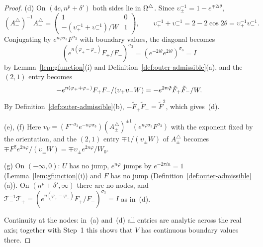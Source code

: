 \begin{proof}
(d) On $(4c,n^p+\delta')$ both sides lie in $\Omega^{\triangle}$. Since $\upsilon_\pm^{-1}=1-e^{\mp2i\theta}$,
\[
  (A^\triangle_-)^{-1}A^\triangle_+=\begin{pmatrix}1&0\\-(\upsilon_+^{-1}+\upsilon_-^{-1})/W&1\end{pmatrix},\qquad
  \upsilon_+^{-1}+\upsilon_-^{-1}=2-2\cos2\theta=\upsilon_+^{-1}\upsilon_-^{-1}.
\]
Conjugating by $e^{n\varphi\sigma_3}F^{\sigma_3}$ with boundary values, the diagonal becomes
\[
  (e^{n(\varphi_+-\varphi_-)}F_+/F_-)^{\sigma_3}=(e^{-2i\theta}e^{2i\theta})^{\sigma_3}=I
\]
by Lemma~\ref{lem:gfunction}(i) and Definition~\ref{def:outer-admissible}(a), and the $(2,1)$ entry becomes
\[
  -e^{n(\varphi_++\varphi_-)}F_+F_-/(\upsilon_+\upsilon_-W)=-e^{2n\tilde\varphi}\tilde F_+\tilde F_-/W .
\]
By Definition~\ref{def:outer-admissible}(b), $-\tilde F_+\tilde F_-=\tilde F^2$, which gives~(d).

(e), (f) Here $v_V=(F^{-\sigma_3}e^{-n\varphi\sigma_3})(A^\triangle_\pm)^{\pm1}(e^{n\varphi\sigma_3}F^{\sigma_3})$ with
the exponent fixed by the orientation, and the $(2,1)$ entry $\mp1/(\upsilon_\pm W)$ of $A^\triangle_\pm$ becomes
$\mp F^2e^{2n\varphi}/(\upsilon_\pm W)=\mp\upsilon_\pm e^{2n\varphi}/W_0$.

(g) On $(-\infty,0)$: $U$ has no jump, $e^{n\varphi}$ jumps by $e^{-2\pi in}=1$ (Lemma~\ref{lem:gfunction}(i)) and $F$
has no jump (Definition~\ref{def:outer-admissible}(a)). On $(n^p+\delta',\infty)$ there are no nodes, and
$\mathcal T_-^{-1}\mathcal T_+=(e^{n(\varphi_+-\varphi_-)}F_+/F_-)^{\sigma_3}=I$ as in~(d).

Continuity at the nodes: in~(a) and~(d) all entries are analytic across the real axis; together with Step~1 this shows
that $V$ has continuous boundary values there.
\end{proof}
